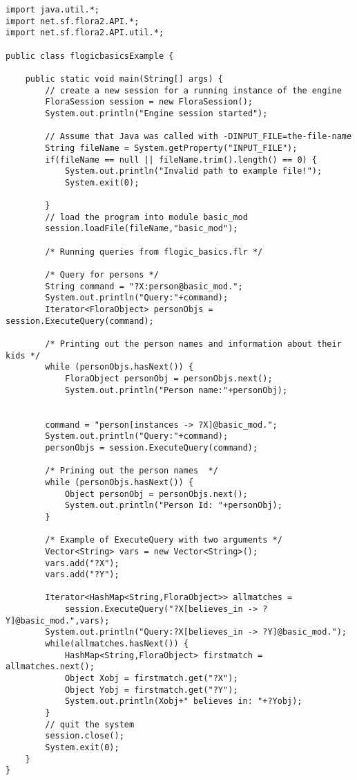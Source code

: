 \begin{verbatim}
import java.util.*;
import net.sf.flora2.API.*;
import net.sf.flora2.API.util.*;

public class flogicbasicsExample {

    public static void main(String[] args) {
        // create a new session for a running instance of the engine
        FloraSession session = new FloraSession();
        System.out.println("Engine session started");

        // Assume that Java was called with -DINPUT_FILE=the-file-name
        String fileName = System.getProperty("INPUT_FILE");
        if(fileName == null || fileName.trim().length() == 0) {
            System.out.println("Invalid path to example file!");
            System.exit(0);

        }
        // load the program into module basic_mod
        session.loadFile(fileName,"basic_mod");

        /* Running queries from flogic_basics.flr */

        /* Query for persons */
        String command = "?X:person@basic_mod.";
        System.out.println("Query:"+command);
        Iterator<FloraObject> personObjs = session.ExecuteQuery(command);

        /* Printing out the person names and information about their kids */
        while (personObjs.hasNext()) {
            FloraObject personObj = personObjs.next();
            System.out.println("Person name:"+personObj);


        command = "person[instances -> ?X]@basic_mod.";
        System.out.println("Query:"+command);
        personObjs = session.ExecuteQuery(command);

        /* Prining out the person names  */
        while (personObjs.hasNext()) {
            Object personObj = personObjs.next();
            System.out.println("Person Id: "+personObj);
        }

        /* Example of ExecuteQuery with two arguments */
        Vector<String> vars = new Vector<String>();
        vars.add("?X");
        vars.add("?Y");

        Iterator<HashMap<String,FloraObject>> allmatches =
            session.ExecuteQuery("?X[believes_in -> ?Y]@basic_mod.",vars);
        System.out.println("Query:?X[believes_in -> ?Y]@basic_mod.");
        while(allmatches.hasNext()) {
            HashMap<String,FloraObject> firstmatch = allmatches.next();
            Object Xobj = firstmatch.get("?X");
            Object Yobj = firstmatch.get("?Y");
            System.out.println(Xobj+" believes in: "+?Yobj);
        }
        // quit the system
        session.close();
        System.exit(0);
    }
}
\end{verbatim}

